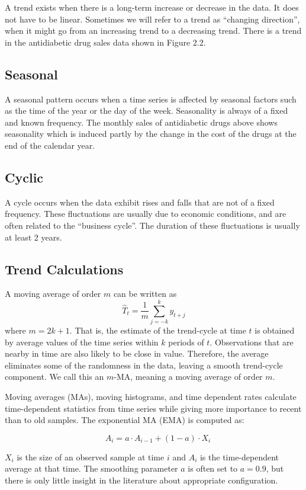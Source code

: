 \documentclass[openany]{book}
\begin{document}
A trend exists when there is a long-term increase or decrease in the data. It does not have to be linear. Sometimes we will refer to a trend as “changing direction”, when it might go from an increasing trend to a decreasing trend. There is a trend in the antidiabetic drug sales data shown in Figure 2.2.



\subsection{Seasonal}
A seasonal pattern occurs when a time series is affected by seasonal factors such as the time of the year or the day of the week. Seasonality is always of a fixed and known frequency. The monthly sales of antidiabetic drugs above shows seasonality which is induced partly by the change in the cost of the drugs at the end of the calendar year.

\subsection{Cyclic}

A cycle occurs when the data exhibit rises and falls that are not of a fixed frequency. These fluctuations are usually due to economic conditions, and are often related to the “business cycle”. The duration of these fluctuations is usually at least 2 years.


\subsection{Trend Calculations}

A moving average of order $m$ can be written as
$$
\hat{T}_t=\frac{1}{m} \sum_{j=-k}^k y_{t+j}
$$
where $m=2 k+1$. That is, the estimate of the trend-cycle at time $t$ is obtained by average values of the time series within $k$ periods of $t$. Observations that are nearby in time are also likely to be close in value. Therefore, the average eliminates some of the randomness in the data, leaving a smooth trend-cycle component. We call this an $m$-MA, meaning a moving average of order $m$.

Moving averages (MAs), moving histograms, and time dependent rates calculate time-dependent statistics from time series while giving more importance to recent than to old samples. The exponential MA (EMA) is computed as: 

$$\quad A_i=a \cdot A_{i-1}+(1-a) \cdot X_i$$

$X_i$ is the size of an observed sample at time $i$ and $A_i$ is the time-dependent average at that time. The smoothing parameter $a$ is often set to $a=0.9$, but there is only little insight in the literature about appropriate configuration.
\end{document}
